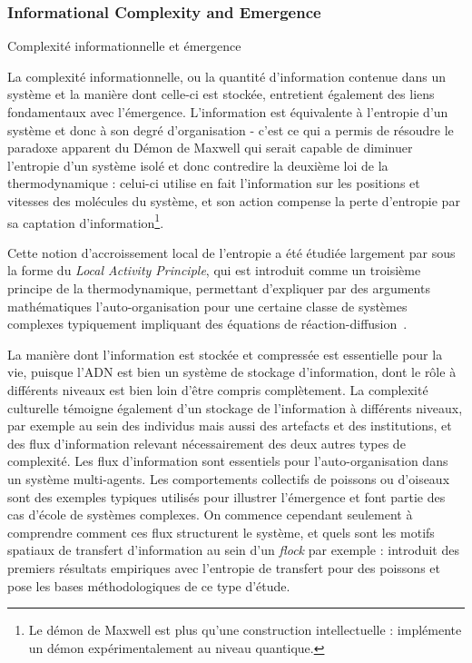 

\subsubsection{Informational Complexity and Emergence}{Complexité informationnelle et émergence}

La complexité informationnelle, ou la quantité d'information contenue dans un système et la manière dont celle-ci est stockée, entretient également des liens fondamentaux avec l'émergence. L'information est équivalente à l'entropie d'un système et donc à son degré d'organisation - c'est ce qui a permis de résoudre le paradoxe apparent du Démon de Maxwell qui serait capable de diminuer l'entropie d'un système isolé et donc contredire la deuxième loi de la thermodynamique : celui-ci utilise en fait l'information sur les positions et vitesses des molécules du système, et son action compense la perte d'entropie par sa captation d'information\footnote{Le démon de Maxwell est plus qu'une construction intellectuelle : \cite{cottet2017observing} implémente un démon expérimentalement au niveau quantique.}.

Cette notion d'accroissement local de l'entropie a été étudiée largement par  sous la forme du \emph{Local Activity Principle}, qui est introduit comme un troisième principe de la thermodynamique, permettant d'expliquer par des arguments mathématiques l'auto-organisation pour une certaine classe de systèmes complexes typiquement impliquant des équations de réaction-diffusion~\cite{mainzer2013local}.


La manière dont l'information est stockée et compressée est essentielle pour la vie, puisque l'ADN est bien un système de stockage d'information, dont le rôle à différents niveaux est bien loin d'être compris complètement. La complexité culturelle témoigne également d'un stockage de l'information à différents niveaux, par exemple au sein des individus mais aussi des artefacts et des institutions, et des flux d'information relevant nécessairement des deux autres types de complexité. Les flux d'information sont essentiels pour l'auto-organisation dans un système multi-agents. Les comportements collectifs de poissons ou d'oiseaux sont des exemples typiques utilisés pour illustrer l'émergence et font partie des cas d'école de systèmes complexes. On commence cependant seulement à comprendre comment ces flux structurent le système, et quels sont les motifs spatiaux de transfert d'information au sein d'un \emph{flock} par exemple : \cite{crosato2017informative} introduit des premiers résultats empiriques avec l'entropie de transfert pour des poissons et pose les bases méthodologiques de ce type d'étude.




